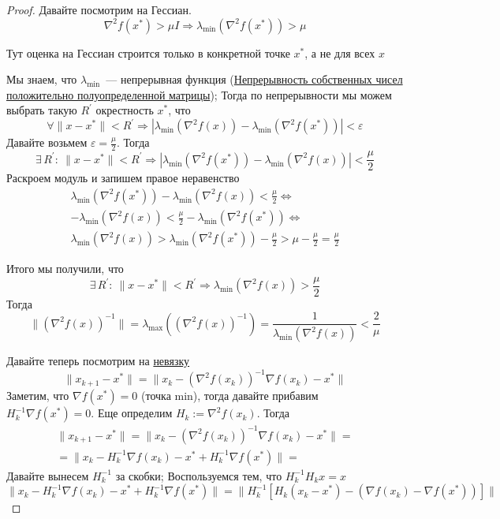 \begin{proof}
  Давайте посмотрим на Гессиан.
  \[
  \nabla^2f(x^{*}) > \mu I \Rightarrow  \lambda_{\min} (\nabla^2 f(x^{*})) > \mu
  \]

  \begin{remark}
    Тут оценка на Гессиан строится только в конкретной точке $x^{*}$, а не для всех $x$
  \end{remark}

  Мы знаем, что $\lambda_{\min}$~--- непрерывная функция (\hyperref[note:5A4CF475-D55C-4CAA-9A68-BD8D3B60AEA9]{Непрерывность собственных чисел положительно полуопределенной матрицы}); Тогда по непрерывности мы можем выбрать такую $R^{\prime}$ окрестность $x^{*}$, что
  \[
  \forall \|x-x^{*}\| < R^{\prime} \Rightarrow | \lambda_{\min}(\nabla^2 f(x)) - \lambda_{\min}(\nabla^2 f(x^{*})) | < \varepsilon
  \]
  Давайте возьмем $\varepsilon = \frac{\mu}{2}$. Тогда
  \[
  \exists\, R^{\prime}:\  \|x-x^{*}\| < R^{\prime} \Rightarrow |\lambda_{\min}(\nabla^2f (x^{*})) - \lambda_{\min}(\nabla^2 f(x))| < \frac{\mu}{2}
  \]
  Раскроем модуль и запишем правое неравенство
  \begin{multline*}
  \lambda_{\min}(\nabla^2f (x^{*})) - \lambda_{\min}(\nabla^2 f(x)) < \frac{\mu}{2} \Leftrightarrow \\
   - \lambda_{\min}(\nabla^2 f(x)) < \frac{\mu}{2} - \lambda_{\min}(\nabla^2f (x^{*})) \Leftrightarrow \\
    \lambda_{\min}(\nabla^2 f(x)) > \lambda_{\min}(\nabla^2f (x^{*})) - \frac{\mu}{2}  > \mu - \frac{\mu}{2} = \frac{\mu}{2}
  \end{multline*}

  Итого мы получили, что
  \[
  \exists\, R^{\prime}:\  \|x-x^{*}\| < R^{\prime} \Rightarrow \lambda_{\min}(\nabla^2 f(x)) > \frac{\mu}{2}
  \]
  Тогда
  \[
  \|(\nabla^2 f(x))^{-1} \| =\lambda_{\max} \left( (\nabla^2 f(x))^{-1} \right) = \frac{1}{\lambda_{\min} (\nabla^2 f(x))} < \frac{2}{\mu}
  \]

  Давайте теперь посмотрим на \hyperref[note:C42D2C19-B35F-4C0E-AFEB-D880CBB72176]{невязку}
  \[
  \|x_{k+1} - x^{*}\| = \|x_k - (\nabla^2 f(x_k))^{-1} \nabla f(x_k) -x^{*}\|
  \]
  Заметим, что $\nabla f(x^{*}) = 0$ (точка min), тогда давайте прибавим $H^{-1}_k \nabla f(x^{*}) = 0$.
  Еще определим $H_k := \nabla^2 f(x_k)$.
  Тогда
  \begin{multline*}
  \|x_{k+1} - x^{*}\| = \|x_k - (\nabla^2 f(x_k))^{-1} \nabla f(x_k) -x^{*}\| = \\
  = \| x_k - H_k^{-1} \nabla f(x_k) - x^{*} +  H_k^{-1}\nabla f(x^{*})\| =
  \end{multline*}
  Давайте  вынесем $H_k^{-1}$ за скобки; Воспользуемся тем, что $H_k^{-1} H_k x = x$
  \[
  \| x_k - H_k^{-1} \nabla f(x_k) - x^{*} +  H_k^{-1}\nabla f(x^{*})\| =
  \| H_k^{-1} [H_k (x_k - x^{*}) - (\nabla f(x_k) - \nabla f(x^{*}))]\|
  \]


\end{proof}
